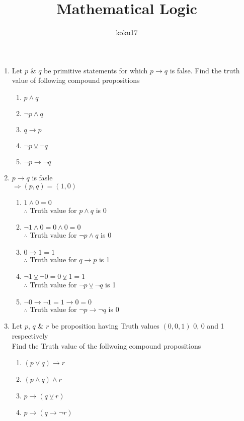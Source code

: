 \documentclass{article}
\author{koku17}
\title{Mathematical Logic}
\newcommand{\answer}{\item [$\rightarrow$]}
\begin{document}
	\maketitle \thispagestyle{empty} \newpage \setcounter{page}{1}
	\begin{enumerate}[label=\arabic*. ]
		\item Let $p$ \& $q$ be primitive statements for which $p\to q$ is false. Find the truth value
			of following compound propositions
			\begin{enumerate}[label=\roman*) ]
				\item $p\land q$
				\item $\neg p\land q$
				\item $q\to p$
				\item $\neg p\veebar\neg q$
				\item $\neg p\to\neg q$
			\end{enumerate}
		\answer $p\to q$ is fasle \\ $\Longrightarrow (p,q)=(1,0)$
			\begin{enumerate}[label=\roman*) ]
				\item $1\land0=0$ \\ $\therefore$ Truth value for $p\land q$ is 0
				\item $\neg1\land0=0\land0=0$ \\ $\therefore$ Truth value for $\neg p\land q$ is
					0
				\item $0\to1=1$ \\ $\therefore$ Truth value for $q\to p$ is 1
				\item $\neg1\veebar\neg0=0\veebar1=1$ \\ $\therefore$ Truth value for
					$\neg p\veebar\neg q$ is 1
				\item $\neg0\to\neg1=1\to0=0$ \\ $\therefore$ Truth value for $\neg p\to\neg q$
					is 0
			\end{enumerate}
		\item Let $p$, $q$ \& $r$ be proposition having Truth values $(0,0,1)$ 0, 0 and 1 respectively
			\\ Find the Truth value of the follwoing compound propositions
			\begin{enumerate}[label=\roman*) ]
				\item $(p\lor q)\to r$
				\item $(p\land q)\land r$
				\item $p\to(q\veebar r)$
				\item $p\to(q\to\neg r)$

\end{enumerate}
\end{enumerate}
\end{document}
